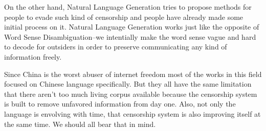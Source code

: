 \documentclass[11pt]{article} %
\begin{document}
On the other hand, Natural Language Generation tries to propose methods for people to evade such kind of censorship and people have already made some initial process on it. Natural Language Generation works just like the opposite of Word Sense Disambiguation--we intentially make the word sense vague and hard to decode for outsiders in order to preserve communicating any kind of information freely.

Since China is the worst abuser of internet freedom most of the works in this field focused on Chinese language specifically. But they all have the same limitation that there aren't too much living corpus available because the censorship system is built to remove unfavored information from day one. Also, not only the language is envolving with time, that censorship system is also improving itself at the same time. We should all bear that in mind.



\end{document}
